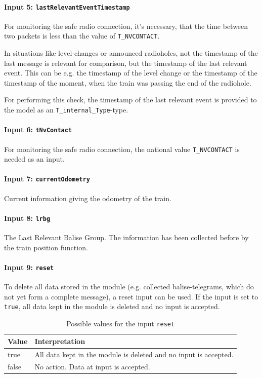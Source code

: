 \documentclass{template/openetcs_report}
\begin{document}
\paragraph{Input 5: \texttt{lastRelevantEventTimestamp}}

For monitoring the safe radio connection, it's necessary, that the time between two packets is less than the value of \texttt{T\_NVCONTACT}.

In situations like level-changes or announced radioholes, not the timestamp of the last message is relevant for comparison, but the timestamp of the last relevant event. This can be e.g. the timestamp of the level change or the timestamp of the timestamp of the moment, when the train was passing the end of the radiohole. 

For performing this check, the timestamp of the last relevant event is provided to the model as an \texttt{T\_internal\_Type}-type.

\paragraph{Input 6: \texttt{tNvContact}}

For monitoring the safe radio connection, the national value \texttt{T\_NVCONTACT} is needed as an input.

\paragraph{Input 7: \texttt{currentOdometry}}
Current information giving the odometry of the train. 

\paragraph{Input 8: \texttt{lrbg}}
The Last Relevant Balise Group. The information has been collected before by the train position function.

\paragraph{Input 9: \texttt{reset}}
To delete all data stored in the module (e.g. collected balise-telegrams, which do not yet form a complete message), a reset input can be used. If the input is set to \texttt{true}, all data kept in the module is deleted and no input is accepted.

\begin{table}[H]
  \begin{tabular}{| l | p{9cm} |}
    \hline
    \textbf{Value} & \textbf{Interpretation}\\ \hline
    true & All data kept in the module is deleted and no input is accepted.\\
    false & No action. Data at input is accepted.\\
    \hline
  \end{tabular} 
  \caption{Possible values for the input \texttt{reset}}
  \label{tbl:reset}
\end{table}
\end{document}
